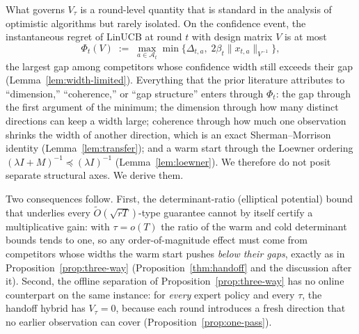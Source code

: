 \documentclass{article}
\theoremstyle{definition}
\theoremstyle{remark}
\theoremstyle{remark}
\begin{document}
What governs $V_\tau$ is a round-level quantity that is standard in the
analysis of optimistic algorithms but rarely isolated. On the confidence event,
the instantaneous regret of LinUCB at round $t$ with design matrix $V$ is at
most
\[
\Phi_t(V)\;:=\;\max_{a\in\mathcal A_t}\min\bigl\{\Delta_{t,a},\;2\beta_t\|x_{t,a}\|_{V^{-1}}\bigr\},
\]
the largest gap among competitors whose confidence width still exceeds their
gap (Lemma~\ref{lem:width-limited}). Everything that the prior literature
attributes to ``dimension,'' ``coherence,'' or ``gap structure'' enters through
$\Phi_t$: the gap through the first argument of the minimum; the dimension
through how many distinct directions can keep a width large; coherence
through how much one observation shrinks the width of another direction, which
is an exact Sherman--Morrison identity (Lemma~\ref{lem:transfer}); and a warm
start through the Loewner ordering $(\lambda I+M)^{-1}\preceq(\lambda I)^{-1}$
(Lemma~\ref{lem:loewner}). We therefore do not posit separate structural axes.
We derive them.

Two consequences follow. First, the determinant-ratio (elliptical potential)
bound that underlies every $\widetilde O(\sqrt{rT})$-type guarantee cannot by
itself certify a multiplicative gain: with $\tau=o(T)$ the ratio of the warm
and cold determinant bounds tends to one, so any order-of-magnitude effect must
come from competitors whose widths the warm start pushes \emph{below their
gaps}, exactly as in Proposition~\ref{prop:three-way}
(Proposition~\ref{thm:handoff} and the discussion after it). Second, the offline
separation of Proposition~\ref{prop:three-way} has no online counterpart on
the same instance: for \emph{every} expert policy and every $\tau$, the
handoff hybrid has $V_\tau=0$, because each round introduces a fresh direction
that no earlier observation can cover (Proposition~\ref{prop:one-pass}).
\end{document}
